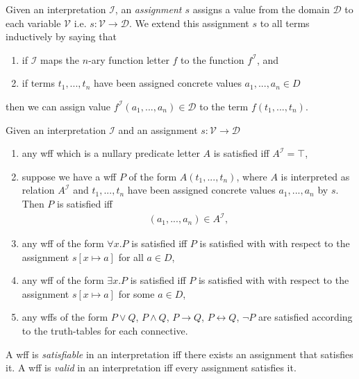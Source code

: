 \documentclass{article}
\begin{document}
\begin{definition}[Assignment]
	Given an interpretation $\mathcal{I}$, an \emph{assignment $s$} assigns a value
	from the domain $\mathcal{D}$ to each variable $\mathcal{V}$ i.e. $s:\mathcal{V}\to\mathcal{D}$.
	We extend this assignment $s$ to all terms inductively by saying that
	\begin{enumerate}
		\item if $\mathcal{I}$ maps the $n$-ary function letter $f$ to the function $f^\mathcal{I}$, and
		\item if terms $t_1, ..., t_n$ have been assigned concrete values $a_1,...,a_n\in D$
	\end{enumerate}
	then we can assign value $f^\mathcal{I}(a_1,...,a_n)\in\mathcal{D}$ to the term
	$f(t_1,...,t_n)$.
\end{definition}

\begin{definition}[Satisfaction]
	Given an interpretation $\mathcal{I}$ and an assignment $s:\mathcal{V}\to\mathcal{D}$
	\begin{enumerate}
		\item any wff which is a nullary predicate letter $A$ is satisfied iff $A^\mathcal{I}=\top$,
		\item suppose we have a wff $P$ of the form $A(t_1,..., t_n)$, where $A$ is
		      interpreted as relation $A^\mathcal{I}$ and $t_1,...,t_n$ have been assigned
		      concrete values $a_1,...,a_n$ by $s$. Then $P$ is satisfied iff \begin{align*}
			      (a_1,...,a_n)\in A^\mathcal{I},
		      \end{align*}
		\item any wff of the form $\forall x.P$ is satisfied iff $P$ is satisfied with
		      with respect to the assignment $s[x\mapsto a]$ for all $a\in D$,
		\item any wff of the form $\exists x.P$ is satisfied iff $P$ is satisfied with
		      with respect to the assignment $s[x\mapsto a]$ for some $a\in D$,
		\item any wffs of the form $P\vee Q$, $P\wedge Q$, $P\rightarrow Q$, $P\leftrightarrow Q$,
		      $\neg P$ are satisfied according to the truth-tables for each connective.
	\end{enumerate}
\end{definition}

\begin{definition}
	A wff is \emph{satisfiable} in an interpretation iff there exists an assignment that satisfies it.
	A wff is \emph{valid} in an interpretation iff every assignment satisfies it.
\end{definition}
\end{document}
